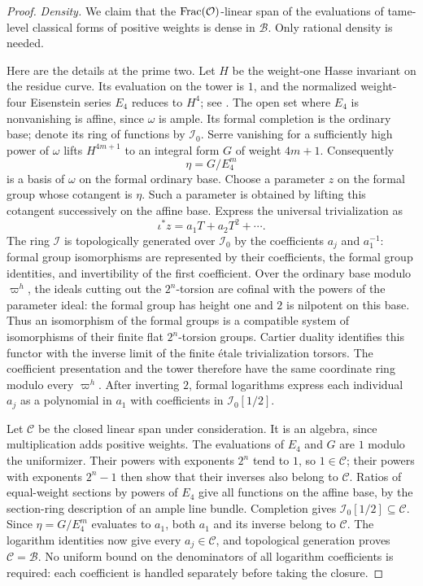 \begin{proof}
\emph{Density.} We claim that the $\operatorname{Frac}(\mathcal O)$-linear
span of the evaluations of tame-level classical forms of positive
weights is dense in $\mathcal B$.  Only rational density is needed.

Here are the details at the prime two.  Let $H$ be the weight-one
Hasse invariant on the residue curve.  Its evaluation on the tower
is $1$, and the normalized weight-four Eisenstein series $E_4$
reduces to $H^4$; see \cite[Section~2.1]{Katz1973}.
The open set where $E_4$ is nonvanishing is affine, since $\omega$
is ample.  Its formal completion is the ordinary base; denote its
ring of functions by $\mathcal I_0$.
Serre vanishing for a sufficiently high power of $\omega$ lifts
$H^{4m+1}$ to an integral form $G$ of weight $4m+1$.
Consequently
\[
 \eta=G/E_4^m
\]
is a basis of $\omega$ on the formal ordinary base.  Choose a
parameter $z$ on the formal group whose cotangent is $\eta$.
Such a parameter is obtained by lifting this cotangent successively
on the affine base.  Express the universal trivialization as
\[
 \iota^*z=a_1T+a_2T^2+\cdots.
\]
The ring $\mathcal I$ is topologically generated over $\mathcal I_0$
by the coefficients $a_j$ and $a_1^{-1}$: formal group isomorphisms
are represented by their coefficients, the formal group identities,
and invertibility of the first coefficient. Over the ordinary base
modulo $\varpi^h$, the ideals cutting out the $2^n$-torsion are cofinal
with the powers of the parameter ideal: the formal group has height
one and $2$ is nilpotent on this base. Thus an isomorphism of the formal
groups is a compatible system of isomorphisms of their finite flat
$2^n$-torsion groups. Cartier duality identifies this functor with the
inverse limit of the finite \'etale trivialization torsors. The
coefficient presentation and the tower therefore have the same
coordinate ring modulo every $\varpi^h$. After inverting $2$, formal logarithms
express each individual $a_j$ as a polynomial in $a_1$ with
coefficients in $\mathcal I_0[1/2]$.

Let $\mathcal C$ be the closed linear span under consideration.
It is an algebra, since multiplication adds positive weights.
The evaluations of $E_4$ and $G$ are $1$ modulo the uniformizer.
Their powers with exponents $2^n$ tend to $1$, so $1\in\mathcal C$;
their powers with exponents $2^n-1$ then show that their inverses
also belong to $\mathcal C$.
Ratios of equal-weight sections by powers of $E_4$ give all
functions on the affine base, by the section-ring description of
an ample line bundle.  Completion gives
$\mathcal I_0[1/2]\subseteq\mathcal C$.
Since $\eta=G/E_4^m$ evaluates to $a_1$, both $a_1$ and
its inverse belong to $\mathcal C$.  The logarithm identities now give every
$a_j\in\mathcal C$, and topological generation proves
$\mathcal C=\mathcal B$.
No uniform bound on the denominators of all logarithm coefficients
is required: each coefficient is handled separately before taking
the closure.


\end{proof}
